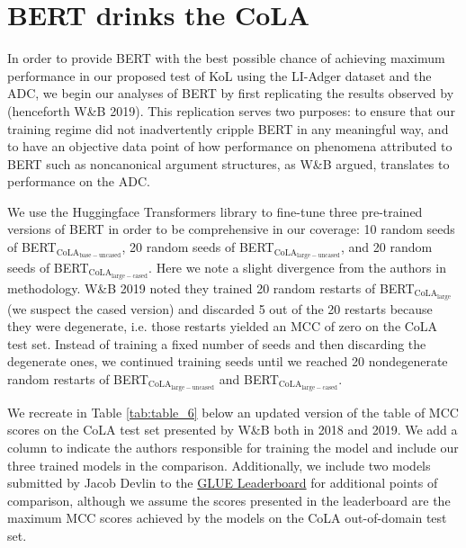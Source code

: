 \section{BERT drinks the CoLA}
\label{section:2.2}
In order to provide BERT with the best possible chance of achieving maximum performance in our proposed test of KoL using the LI-Adger dataset and the ADC, we begin our analyses of BERT by first replicating the results observed by \citet{warstadt2019linguistic}(henceforth W\&B 2019).  This replication serves two purposes: to ensure that our training regime did not inadvertently cripple BERT in any meaningful way, and to have an objective data point of how performance on phenomena attributed to BERT such as noncanonical argument structures, as W\&B argued, translates to performance on the ADC.

We use the Huggingface Transformers library \citep{wolf-etal-2020-transformers} to fine-tune three pre-trained versions of BERT in order to be comprehensive in our coverage: 10 random seeds of BERT$_\mathrm{CoLA_{base-uncased}}$, 20 random seeds of BERT$_\mathrm{CoLA_{large-uncased}}$, and 20 random seeds of BERT$_\mathrm{CoLA_{large-cased}}$.  Here we note a slight divergence from the authors in methodology.  W\&B 2019 noted they trained 20 random restarts of BERT$_\mathrm{CoLA_{large}}$ (we suspect the cased version) and discarded 5 out of the 20 restarts because they were degenerate, i.e. those restarts yielded an MCC of zero on the CoLA test set.  Instead of training a fixed number of seeds and then discarding the degenerate ones, we continued training seeds until we reached 20 nondegenerate random restarts of BERT$_\mathrm{CoLA_{large-uncased}}$ and BERT$_\mathrm{CoLA_{large-cased}}$.  

We recreate in Table \ref{tab:table_6} below an updated version of the table of MCC scores on the CoLA test set presented by W\&B both in 2018 and 2019.  We add a column to indicate the authors responsible for training the model and include our three trained models in the comparison.  Additionally, we include two models submitted by Jacob Devlin to the \hyperref[https://gluebenchmark.com/leaderboard]{GLUE Leaderboard} for additional points of comparison, although we assume the scores presented in the leaderboard are the maximum MCC scores achieved by the models on the CoLA out-of-domain test set.

